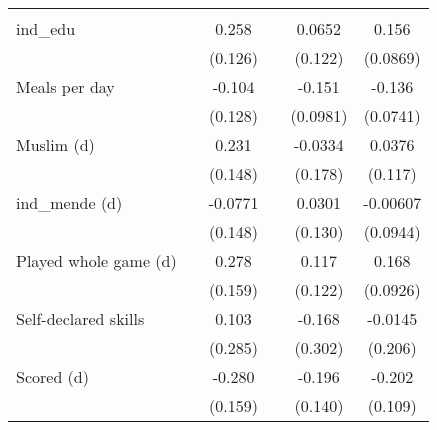 {\begin{tabular}{l*{5}{c}}
                    &                     &                     &                     &                     &                     \\
[1em]
ind\_edu             &                     &       0.258\sym{**} &                     &      0.0652         &       0.156\sym{*}  \\
                    &                     &     (0.126)         &                     &     (0.122)         &    (0.0869)         \\
[1em]
Meals per day       &                     &      -0.104         &                     &      -0.151         &      -0.136\sym{*}  \\
                    &                     &     (0.128)         &                     &    (0.0981)         &    (0.0741)         \\
[1em]
Muslim (d)          &                     &       0.231         &                     &     -0.0334         &      0.0376         \\
                    &                     &     (0.148)         &                     &     (0.178)         &     (0.117)         \\
[1em]
ind\_mende (d)       &                     &     -0.0771         &                     &      0.0301         &    -0.00607         \\
                    &                     &     (0.148)         &                     &     (0.130)         &    (0.0944)         \\
[1em]
Played whole game (d)&                     &       0.278\sym{*}  &                     &       0.117         &       0.168\sym{*}  \\
                    &                     &     (0.159)         &                     &     (0.122)         &    (0.0926)         \\
[1em]
Self-declared skills&                     &       0.103         &                     &      -0.168         &     -0.0145         \\
                    &                     &     (0.285)         &                     &     (0.302)         &     (0.206)         \\
[1em]
Scored (d)          &                     &      -0.280\sym{*}  &                     &      -0.196         &      -0.202\sym{*}  \\
                    &                     &     (0.159)         &                     &     (0.140)         &     (0.109)         \\

\end{tabular}}
